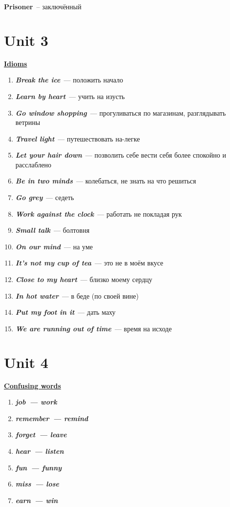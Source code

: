 \documentclass[10pt,a4paper]{article}
\begin{document}
\textbf{Prisoner}~-- заключённый





\section{Unit 3}
\textbf{\underline{Idioms}}

\begin{enumerate}
 \item \textit{\textbf{Break the ice}}~--- положить начало 
 \item \textit{\textbf{Learn by heart}}~--- учить на изусть
 \item \textit{\textbf{Go window shopping}}~--- прогуливаться по магазинам, разглядывать ветрины
 \item \textit{\textbf{Travel light}}~--- путешествовать на-легке
 \item \textit{\textbf{Let your hair down}}~--- позволить себе вести себя более спокойно и расслаблено
 \item \textit{\textbf{Be in two minds}}~--- колебаться, не знать на что решиться
 \item \textit{\textbf{Go grey}}~--- седеть
 \item \textit{\textbf{Work against the clock}}~--- работать не покладая рук
 \item \textit{\textbf{Small talk}}~--- болтовня
 \item \textit{\textbf{On our mind}}~--- на уме
 \item \textit{\textbf{It's not my cup of tea}}~--- это не в моём вкусе
 \item \textit{\textbf{Close to my heart}}~--- близко моему сердцу
 \item \textit{\textbf{In hot water}}~--- в беде (по своей вине)
 \item \textit{\textbf{Put my foot in it}}~--- дать маху
 \item \textit{\textbf{We are running out of time}}~--- время на исходе
\end{enumerate}

 
 


\section{Unit 4}

\textbf{\underline{Confusing words}}
\begin{enumerate}
  \item \textit{\textbf{job~--- work}}
  \item \textit{\textbf{remember~--- remind}}
  \item \textit{\textbf{forget~--- leave}}
  \item \textit{\textbf{hear~--- listen}}
  \item \textit{\textbf{fun~--- funny}}
  \item \textit{\textbf{miss~--- lose}}
  \item \textit{\textbf{earn~--- win}}
\end{enumerate}
\end{document}
